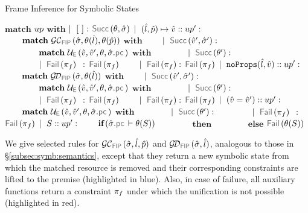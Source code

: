 {\footnotesize \begin{algorithm}[t!]
\caption{Frame Inference for Symbolic States}\label{fip:symb:states}
\begin{algorithmic}[1]
    \State $\textbf{match}$ $up$ $\textbf{with}$
    \State $\mid~[ \ ]:$ \Return $\success{\subst, \sstate}$
    \State $\mid~(\hat{l}, \hat{p}) \mapsto \hat{v} :: up' :$ 
    \State $\qquad \textbf{match} \ \GetCellV{\sstate, \subst(\sloc), \subst(\sexprp)}$ $\textbf{with}$
    \State $\qquad \mid~\success{\sexprv', \sstate'}:$
    \State $\qquad \qquad \textbf{match} \ \unifylexpr(\sexprv, \sexprv', \subst, \sstate.\pcsel)$ $\textbf{with}$
     \State $\qquad \qquad \mid~ \success{\subst'}:$ \Return {}
      \State $\qquad \qquad \mid~ \fail{\pc_f} \ \, :$ \Return $\fail{\pc_f}$
      \State $\qquad \mid~\fail{\pc_f}:$ \Return $\fail{\pc_f}$
     \State $\mid~\texttt{noProps}(\hat{l}, \hat{v}) :: up' :$  
       \State $\qquad \textbf{match} \ \GetDomainV{\sstate, \subst(\sloc)}$ $\textbf{with}$
       \State $\qquad \mid~\success{\sexprv', \sstate'}:$
         \State $\qquad \qquad \textbf{match} \ \unifylexpr(\sexprv, \sexprv', \subst, \sstate.\pcsel)$ $\textbf{with}$
       \State $\qquad \qquad \mid~ \success{\subst'}:$ \Return {}
       \State $\qquad \qquad \mid~ \fail{\pc_f} \ \, :$ \Return $\fail{\pc_f}$
       \State $\qquad \mid~\fail{\pc_f}:$ \Return $\fail{\pc_f}$
     \State $\mid~(\hat{v} = \hat{v}') :: up' :$  
        \State $\qquad \textbf{match} \ \unifylexpr(\sexprv, \sexprv', \subst, \sstate.\pcsel)$ $\textbf{with}$
         \State $\qquad \qquad \mid~ \success{\subst'}:$ \Return {}
       \State $\qquad \qquad \mid~ \fail{\pc_f} \ \, :$ \Return $\fail{\pc_f}$
     \State $\mid~S :: up' :$   
      \State $\qquad \textbf{if} \,(\sstate.\pcsel \vdash \subst(\sass))$
       \State $\qquad \qquad \textbf{then}$ \Return  {}
      \State $\qquad \qquad \textbf{else}$  \Return $\fail{\subst(\sass)}$
\EndFunction
\end{algorithmic}
\end{algorithm}}

We give selected rules for $\GetCellV{\sstate, \sloc, \sexprp}$ and $\GetDomainV{\sstate, \sloc}$, analogous to those in \S\ref{subsec:symb:semantics}, except that they return a new symbolic state 
from which the matched resource is removed and their corresponding constraints are lifted to the premise (highlighted in blue). Also, in case of failure, all auxiliary functions return a constraint $\pi_f$ under which the unification is not possible (highlighted in red). 

